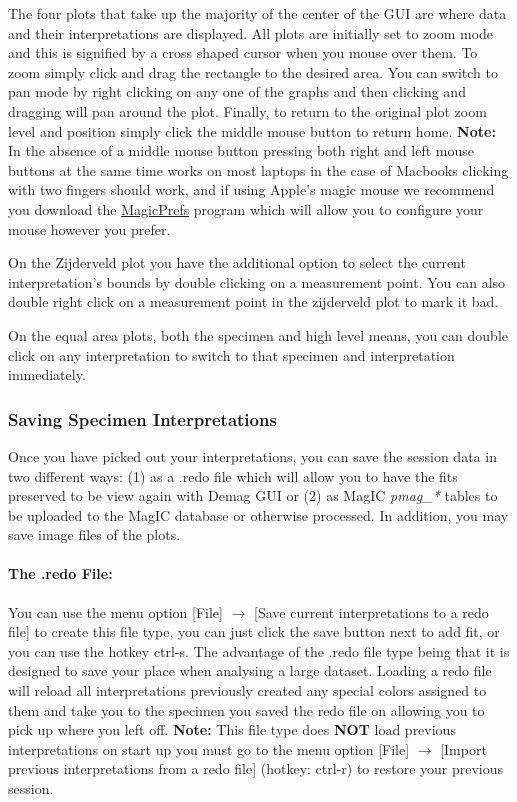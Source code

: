 \documentclass[11pt]{book}
\begin{document}
{{The four plots that take up the majority of the center of the GUI are where data and their interpretations are displayed. All plots are initially set to zoom mode and this is signified by a cross shaped cursor when you mouse over them. To zoom simply click and drag the rectangle to the desired area. You can switch to pan mode by right clicking on any one of the graphs and then clicking and dragging will pan around the plot. Finally, to return to the original plot zoom level and position simply click the middle mouse button to return home. \textbf{Note:} In the absence of a middle mouse button pressing both right and left mouse buttons at the same time works on most laptops in the case of Macbooks clicking with two fingers should work, and if using Apple's magic mouse we recommend you download the \href{http://magicprefs.com/}{MagicPrefs} program which will allow you to configure your mouse however you prefer.

\noindent On the Zijderveld plot you have the additional option to select the current interpretation's bounds by double clicking on a measurement point. You can also double right click on a measurement point in the zijderveld plot to mark it bad.

\noindent On the equal area plots, both the specimen and high level means, you can double click on any interpretation to switch to that specimen and interpretation immediately.

\subsubsection{Saving Specimen Interpretations}\label{saving-specimen-interpretations}

Once you have picked out your interpretations, you can save the session data in two different ways: (1) as a .redo file which will allow you to have the fits preserved to be view again with Demag GUI or (2) as MagIC {\it pmag\_*} tables to be uploaded to the MagIC database or otherwise processed. In addition, you may save image files of the plots.

\paragraph{The .redo File:}\label{the-.redo-file} You can use the menu option [File] $\rightarrow$ [Save current interpretations to a redo file] to create this file type, you can just click the save button next to add fit, or you can use the hotkey ctrl-s. The advantage of the .redo file type being that it is designed to save your place when analysing a large dataset. Loading a redo file will reload all interpretations previously created any special colors assigned to them and take you to the specimen you saved the redo file on allowing you to pick up where you left off. \textbf{Note:} This file type does \textbf{NOT} load previous interpretations on start up you must go to the menu option [File] $\rightarrow$ [Import previous interpretations from a redo file] (hotkey: ctrl-r) to restore your previous session.

}}
\end{document}
